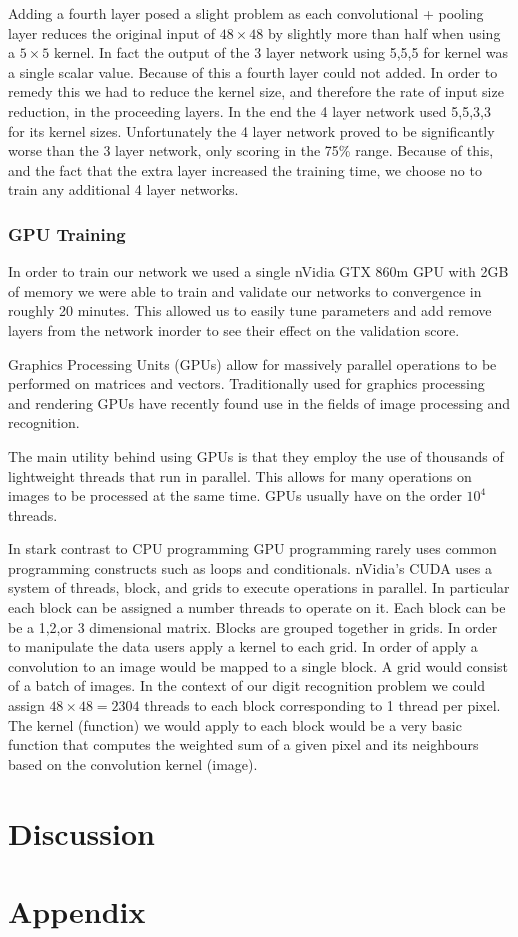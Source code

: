 \documentclass[10pt,twocolumn]{article}
\begin{document}
Adding a fourth layer posed a slight problem as each convolutional + pooling layer reduces the original input of $48 \times 48$ by slightly more than half when using a $5 \times 5$ kernel. In fact the output of the 3 layer network using 5,5,5 for kernel was a single scalar value. Because of this a fourth layer could not added. In order to remedy this we had to reduce the kernel size, and therefore the rate of input size reduction, in the proceeding layers. In the end the 4 layer network used 5,5,3,3 for its kernel sizes. Unfortunately the 4 layer network proved to be significantly worse than the 3 layer network, only scoring in the 75\% range. Because of this, and the fact that the extra layer increased the training time, we choose no to train any additional 4 layer networks.
 
\subsubsection{GPU Training}
In order to train our network we used a single nVidia GTX 860m GPU with 2GB of memory we were able to train and validate our networks to convergence in roughly 20 minutes. This allowed us to easily tune parameters and add remove layers from the network inorder to see their effect on the validation score.

Graphics Processing Units (GPUs) allow for massively parallel operations to be performed on matrices and vectors. Traditionally used for graphics processing and rendering GPUs have recently found use in the fields of image processing and recognition. 

The main utility behind using GPUs is that they employ the use of thousands of lightweight threads that run in parallel. This allows for many operations on images to be processed at the same time. GPUs usually have on the order $10^4$ threads.

In stark contrast to CPU programming GPU programming rarely uses common programming constructs such as loops and conditionals. nVidia\textsuperscript{\textregistered}'s CUDA uses a system of threads, block, and grids to execute operations in parallel. In particular each block can be assigned a number threads to operate on it. Each block can be be a 1,2,or 3 dimensional matrix. Blocks are grouped together in grids. In order to manipulate the data  users apply a kernel to each grid. In order of apply a convolution to an image would be mapped to a single block. A grid would consist of a batch of images. In the context of our digit recognition problem we could assign $48 \times 48 = 2304$ threads to each block corresponding to 1 thread per pixel. The kernel (function) we would apply to each block would be a very basic function that computes the weighted sum of a given pixel and its neighbours based on the convolution kernel (image).
\section{Discussion}


\section*{Appendix}
\end{document}
